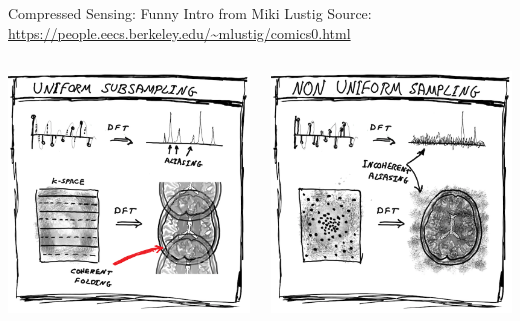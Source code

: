 \documentclass[aspectratio=169]{beamer}
\begin{document}
	\begin{frame}{Compressed Sensing: Funny Intro from Miki Lustig}
		Source: \url{https://people.eecs.berkeley.edu/~mlustig/comics0.html}
		\vspace{1em}
		\begin{columns}
			\centering
			\includegraphics[width=\columnwidth]{figures/cs-lustig-comics-15.png}
			
			\centering
			\includegraphics[width=\columnwidth]{figures/cs-lustig-comics-16.png}
		\end{columns}
	\end{frame}
	
\end{document}
